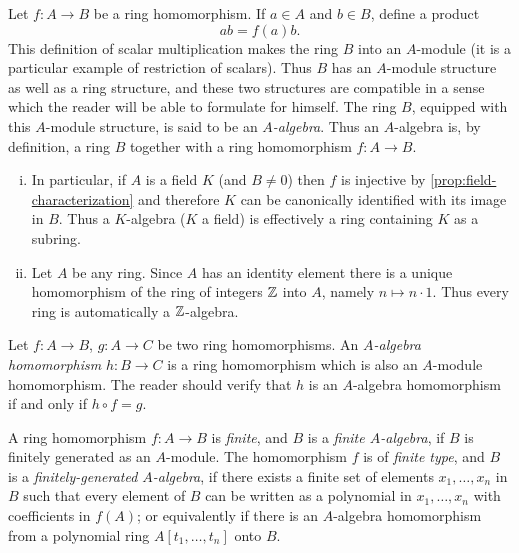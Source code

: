 
Let $f \colon A \to B$ be a ring homomorphism. If $a \in A$ and $b \in B$, define a product
\[
    ab = f(a)b.
\]
This definition of scalar multiplication makes the ring $B$ into an $A$-module (it is a particular example of restriction of scalars). Thus $B$ has an $A$-module structure as well as a ring structure, and these two structures are compatible in a sense which the reader will be able to formulate for himself. The ring $B$, equipped with this $A$-module structure, is said to be an \emph{$A$-algebra}. Thus an $A$-algebra is, by definition, a ring $B$ together with a ring homomorphism $f \colon A \to B$.

\begin{remark}
\begin{enumerate}[i)]
    \item In particular, if $A$ is a field $K$ (and $B \neq 0$) then $f$ is injective by \eqref{prop:field-characterization} and therefore $K$ can be canonically identified with its image in $B$. Thus a $K$-algebra ($K$ a field) is effectively a ring containing $K$ as a subring.
    
    \item Let $A$ be any ring. Since $A$ has an identity element there is a unique homomorphism of the ring of integers $\mathbb{Z}$ into $A$, namely $n \mapsto n \cdot 1$. Thus every ring is automatically a $\mathbb{Z}$-algebra.
\end{enumerate}
\end{remark}

Let $f \colon A \to B$, $g \colon A \to C$ be two ring homomorphisms. An \emph{$A$-algebra homomorphism} $h \colon B \to C$ is a ring homomorphism which is also an $A$-module homomorphism. The reader should verify that $h$ is an $A$-algebra homomorphism if and only if $h \circ f = g$.

A ring homomorphism $f \colon A \to B$ is \emph{finite}, and $B$ is a \emph{finite $A$-algebra}, if $B$ is finitely generated as an $A$-module. The homomorphism $f$ is of \emph{finite type}, and $B$ is a \emph{finitely-generated $A$-algebra}, if there exists a finite set of elements $x_1, \ldots, x_n$ in $B$ such that every element of $B$ can be written as a polynomial in $x_1, \ldots, x_n$ with coefficients in $f(A)$; or equivalently if there is an $A$-algebra homomorphism from a polynomial ring $A[t_1, \ldots, t_n]$ onto $B$.

